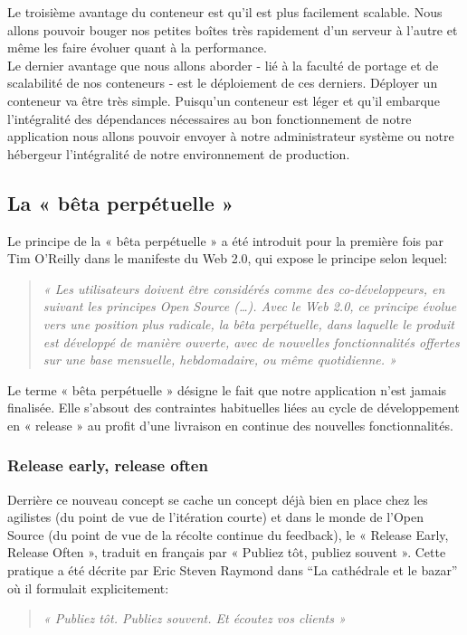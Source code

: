       Le troisième avantage du conteneur est qu’il est plus facilement scalable. Nous allons pouvoir bouger nos petites boîtes très rapidement d’un serveur à l’autre et même les faire évoluer quant à la performance.\\

      Le dernier avantage que nous allons aborder - lié à la faculté de portage et de scalabilité de nos conteneurs - est le déploiement de ces derniers. Déployer un conteneur va être très simple. Puisqu’un conteneur est léger et qu’il embarque l’intégralité des dépendances nécessaires au bon fonctionnement de notre application nous allons pouvoir envoyer à notre administrateur système ou notre hébergeur l’intégralité de notre environnement de production.

    \subsection{La « bêta perpétuelle »}
    Le principe de la « bêta perpétuelle » a été introduit pour la première fois par Tim O’Reilly dans le manifeste du Web 2.0, qui expose le principe selon lequel:\\
    \begin{quotation}
      \emph{« Les utilisateurs doivent être considérés comme des co-développeurs, en suivant les principes Open Source (…). Avec le Web 2.0, ce principe évolue vers une position plus radicale, la bêta perpétuelle, dans laquelle le produit est développé de manière ouverte, avec de nouvelles fonctionnalités offertes sur une base mensuelle, hebdomadaire, ou même quotidienne. »}\\
    \end{quotation}

    Le terme « bêta perpétuelle » désigne le fait que notre application n’est jamais finalisée. Elle s’absout des contraintes habituelles liées au cycle de développement en « release » au profit d’une livraison en continue des nouvelles fonctionnalités.

      \subsubsection{Release early, release often}
      Derrière ce nouveau concept se cache un concept déjà bien en place chez les agilistes (du point de vue de l’itération courte) et dans le monde de l’Open Source (du point de vue de la récolte continue du feedback), le « Release Early, Release Often », traduit en français par « Publiez tôt, publiez souvent ». Cette pratique a été décrite par Eric Steven Raymond dans “La cathédrale et le bazar” où il formulait explicitement:\\
      \begin{quotation}
        \emph{« Publiez tôt. Publiez souvent. Et écoutez vos clients »}\\
      \end{quotation}

